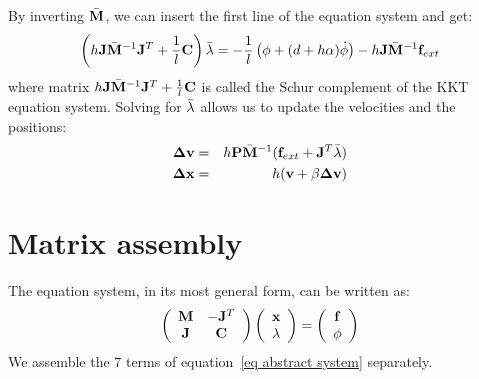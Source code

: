 
By inverting $\bar{\mathbf{M}}$, we can insert the first line of the equation system and get:
\begin{equation} \label{eq schur complement}
 \left( h\mathbf{J}\bar{\mathbf{M}}^{-1}\mathbf{J}^T + \frac{1}{l}\mathbf{C} \right) \bar{\mathbf{\lambda}} = -\frac{1}{l} \left(\phi + (d+h\alpha)\dot {\phi} \right) - h\mathbf{J} \bar{\mathbf{M}}^{-1} \mathbf{f}_{ext}
\end{equation}
where matrix $ h\mathbf{J}\bar{\mathbf{M}}^{-1}\mathbf{J}^T + \frac{1}{l}\mathbf{C} $ is called the Schur complement of the KKT equation system.
Solving for $\bar{\mathbf{\lambda}}$ allows us to update the velocities and the positions:
\begin{eqnarray}
 \mathbf{\Delta v} &=& h\mathbf{P}\bar{\mathbf{M}}^{-1}(\mathbf{f}_{ext} +\mathbf{J}^T \bar{\mathbf{\lambda}} ) \label{eq update velocities}\\
\mathbf{\Delta x} &=& h( \mathbf{v} + \beta \mathbf{\Delta v} ) \label{eq update positions}
\end{eqnarray}



\section{Matrix assembly} \label{sec matrix assembly}
The equation system, in its most general form, can be written as:
\begin{equation}
 \label{eq abstract system}
 \left( \begin{array}{cc}
\mathbf{M} & -\mathbf{J}^T \\
\mathbf{J} &  \mathbf{C} \end{array}\right)
\left( \begin{array}{c}
\mathbf{x} \\ \mathbf{\lambda}
\end{array}\right) = \left( \begin{array}{c}
\mathbf{f}  \\
\phi
\end{array}\right) 
\end{equation}
We assemble the $7$ terms of equation~\ref{eq abstract system} separately. 

